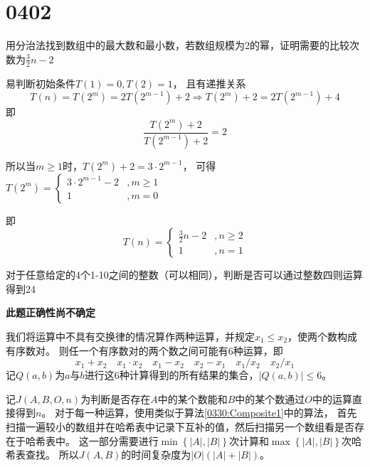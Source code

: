 \section{0402}\label{sec:0402}
\begin{questions}

    \question 用分治法找到数组中的最大数和最小数，若数组规模为2的幂，证明需要的比较次数为$\frac{3}{2} n -2$
    \begin{solution}
        易判断初始条件$T(1) = 0, T(2) = 1$，
        且有递推关系
        \[ T(n) = T(2^m) = 2T(2^{m-1}) + 2 \Rightarrow T(2^m) + 2 = 2T(2^{m-1}) + 4 \]
        即
        \[ \frac{T(2^m) + 2}{T(2^{m-1}) + 2} = 2 \]

        所以当$m \ge 1$时，$T(2^m) + 2 = 3 \cdot 2^{m-1}$，
        可得$T(2^m) = \begin{cases}
                3 \cdot 2^{m-1} - 2 & , m \ge 1 \\
                1                   & , m = 0
            \end{cases}
        $

        即
        \[
            T(n) = \begin{cases}
                \frac{3}{2} n - 2 & , n \ge 2 \\
                1                 & , n = 1
            \end{cases}
        \]
    \end{solution}

    \question 对于任意给定的4个1-10之间的整数（可以相同），判断是否可以通过整数四则运算得到24
    \begin{solution}
        \textbf{
            \color{red}
            此题正确性尚不确定
        }

        我们将运算中不具有交换律的情况算作两种运算，并规定$x_1 \leq x_2$，使两个数构成有序数对。
        则任一个有序数对的两个数之间可能有$6$种运算，即 \[
            x_1 + x_2 \quad x_1 \cdot x_2 \quad x_1 - x_2 \quad x_2 - x_1 \quad x_1 / x_2 \quad x_2 / x_1
        \]
        记$Q(a,b)$为$a$与$b$进行这$6$种计算得到的所有结果的集合，$|Q(a,b)| \le 6$。

        记$J(A,B,O,n)$为判断是否存在$A$中的某个数能和$B$中的某个数通过$O$中的运算直接得到$n$。
        对于每一种运算，使用类似于算法\ref{0330:Composite1}中的算法，
        首先扫描一遍较小的数组并在哈希表中记录下互补的值，然后扫描另一个数组看是否存在于哈希表中。
        这一部分需要进行$\min\left\{ |A|, |B| \right\}$次计算和$\max\left\{ |A|, |B| \right\}$次哈希表查找。
        所以$J(A,B)$的时间复杂度为$|O|(|A| + |B|)$。


\end{solution}
\end{questions}
